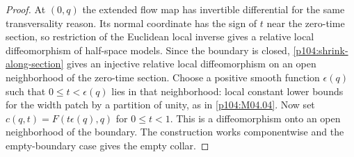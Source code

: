 \documentclass[11pt,oneside,openany]{book}
\theoremstyle{definition}
\theoremstyle{remark}
\begin{document}
\begin{proof}
At \((0,q)\) the extended flow map has invertible differential for the same transversality reason. Its normal coordinate has the sign of \(t\) near the zero-time section, so restriction of the Euclidean local inverse gives a relative local diffeomorphism of half-space models. Since the boundary is closed, \cref{p104:shrink-along-section} gives an injective relative local diffeomorphism on an open neighborhood of the zero-time section. Choose a positive smooth function \(\epsilon(q)\) such that \(0\leq t<\epsilon(q)\) lies in that neighborhood: local constant lower bounds for the width patch by a partition of unity, as in \cref{p104:M04.04}. Now set \(c(q,t)=F(t\epsilon(q),q)\) for \(0\leq t<1\). This is a diffeomorphism onto an open neighborhood of the boundary. The construction works componentwise and the empty-boundary case gives the empty collar.
\end{proof}
\end{document}
